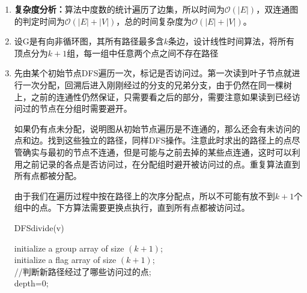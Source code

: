 \documentclass[12pt,a4paper]{article}
\makeatletter
\newtheorem*{solution}{Solution}
\theoremstyle{definition}
\renewenvironment{solution}[1][Solution] {\par\pushQED{\qed}\normalfont\topsep6\p@\@plus6\p@\relax\trivlist\item[\hskip\labelsep\bfseries#1\@addpunct{.}]\ignorespaces}{\popQED\endtrivlist\@endpefalse} \makeatother
\makeatother
\begin{document}
\begin{enumerate}
\begin{solution}
	\textbf{复杂度分析：}算法中度数的统计遍历了边集，所以时间为$\mathcal{O}(|E|)$，双连通图的判定时间为$\mathcal{O}(|E|+|V|)$，总的时间复杂度为$\mathcal{O}(|E|+|V|)$。
\end{solution}

\item 设G是有向非循环图，其所有路径最多含$k$条边，设计线性时间算法，将所有顶点分为$k+1$组，每一组中任意两个点之间不存在路径

\begin{solution}
	先由某个初始节点DFS遍历一次，标记是否访问过。第一次读到叶子节点就进行一次分配，回溯后进入刚刚经过的分支的兄弟分支，由于仍然在同一棵树上，之前的连通性仍然保证，只需要看之后的部分，需要注意如果读到已经访问过的节点在分组时需要避开。
	
	如果仍有点未分配，说明图从初始节点遍历是不连通的，那么还会有未访问的点和边。找到这些独立的路径，同样DFS操作。注意此时求出的路径上的点尽管确实与最初的节点不连通，但是可能与之前去掉的某些点连通，这时可以利用之前记录的各点是否访问过，在分配组时避开被访问过的点。重复算法直到所有点都被分配。
	
	由于我们在遍历过程中按在路径上的次序分配点，所以不可能有放不到$k+1$个组中的点。下方算法需要更换点执行，直到所有点都被访问过。
	\begin{center}
		\begin{algorithm}[H]
			\caption{DFSdivide(v)}
			initialize a group array of size $(k+1)$;\\
			initialize a flag array of size $(k+1)$;\\
			//判断新路径经过了哪些访问过的点;\\
			depth=0;\\
		\end{algorithm}
	\end{center}
	

\end{solution}
\end{enumerate}
\end{document}
